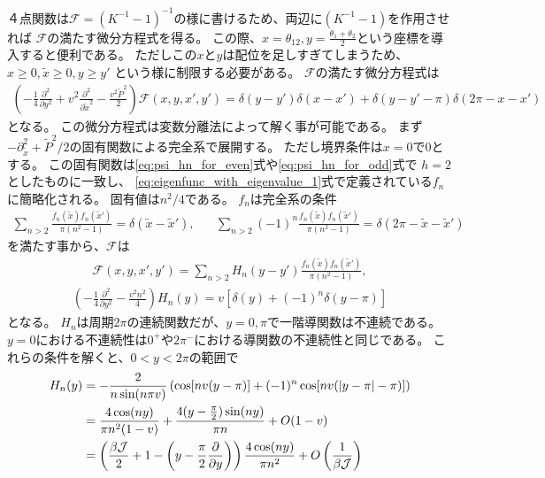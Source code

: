 ４点関数は$\mathcal{F} = (K^{-1} - 1)^{-1}$の様に書けるため、両辺に$(K^{-1} - 1)$を作用させれば
$\mathcal{F}$の満たす微分方程式を得る。
この際、$x = \theta_{12}, y = \frac{\theta_1 + \theta_2}{2}$という座標を導入すると便利である。
ただしこの$x$と$y$は配位を足しすぎてしまうため、$x \geq 0, \tilde{x} \geq 0, y \geq y'$
という様に制限する必要がある。
$\mathcal{F}$の満たす微分方程式は
\begin{align}
	\left(
		- \frac{1}{4}\frac{\partial^2}{\partial y^2}
		+ v^2\frac{\partial^2}{\partial \tilde{x}^2}
		- \frac{v^2\tilde{P}^2}{2}
	\right)\mathcal{F}(x, y, x', y')
	= \delta(y - y')\delta(x - x') + \delta(y - y' - \pi)\delta(2\pi - x - x')
\end{align}
となる。
この微分方程式は変数分離法によって解く事が可能である。
まず$-\partial^2_{\tilde{x}} + \tilde{P}^2 / 2$の固有関数による完全系で展開する。
ただし境界条件は$x = 0$で0とする。
この固有関数は\eqref{eq:psi_hn_for_even}式や\eqref{eq:psi_hn_for_odd}式で
$h=2$としたものに一致し、
\eqref{eq:eigenfunc_with_eigenvalue_1}式で定義されている$f_n$に簡略化される。
固有値は$n^2/4$である。
$f_n$は完全系の条件
\begin{align}
	\sum_{n>2}\frac{f_n(\tilde{x})f_n(\tilde{x}')}{\pi(n^2 - 1)}
	= \delta(\tilde{x} - \tilde{x}'),\hspace{20pt}
	\sum_{n>2}(-1)^n\frac{f_n(\tilde{x})f_n(\tilde{x}')}{\pi(n^2 - 1)}
	= \delta(2\pi - \tilde{x} - \tilde{x}')
\end{align}
を満たす事から、$\mathcal{F}$は
\begin{align}
	\mathcal{F}(x, y, x', y')
	= \sum_{n>2}H_n(y - y')\frac{f_n(\tilde{x})f_n(\tilde{x}')}{\pi(n^2 - 1)},
	\label{eq:h2_contribution_for_fourpointfunc_in_large_q}
\end{align}
\begin{align}
	\left(-\frac{1}{4}\frac{\partial^2}{\partial y^2} - \frac{v^2n^2}{4}\right)H_n(y)
	= v[\delta(y) + (-1)^n\delta(y-\pi)]
\end{align}
となる。
$H_n$は周期$2\pi$の連続関数だが、$y=0, \pi$で一階導関数は不連続である。
$y=0$における不連続性は$0^+$や$2\pi^-$における導関数の不連続性と同じである。
これらの条件を解くと、$0 < y < 2\pi$の範囲で
\begin{align}
	H_n(y)
	&= -\frac{2}{n\sin(n\pi v)}
	\left(
		\cos[nv(y - \pi)] + (-1)^n\cos[nv(|y-\pi| - \pi)]
	\right)\\
	&= \frac{4\cos(ny)}{\pi n^2(1-v)}
		+ \frac{4(y-\frac{\pi}{2})\sin(ny)}{\pi n} + O(1 - v)\\
	&= \left(
			\frac{\beta\mathcal{J}}{2} + 1 - \left(y - \frac{\pi}{2}\frac{\partial}{\partial y}\right)	
		\right)\frac{4\cos(ny)}{\pi n^2} + O\left(\frac{1}{\beta\mathcal{J}}\right)
\end{align}
